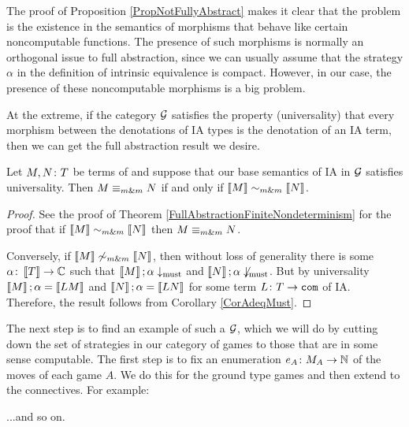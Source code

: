 \documentclass{article}
\begin{document}
The proof of Proposition \ref{PropNotFullyAbstract} makes it clear that the problem is the existence in the semantics of morphisms that behave like certain noncomputable functions.  
The presence of such morphisms is normally an orthogonal issue to full abstraction, since we can usually assume that the strategy $\alpha$ in the definition of intrinsic equivalence is compact.
However, in our case, the presence of these noncomputable morphisms is a big problem.

At the extreme, if the category $\mathcal G$ satisfies the property (universality) that every morphism between the denotations of IA types is the denotation of an IA term, then we can get the full abstraction result we desire.

\begin{theorem}
  Let $M,N\colon T$ be terms of \IAX and suppose that our base semantics of IA in $\mathcal G$ satisfies universality.  
  Then $M\mathrel{\equiv_{m\&m}} N$ if and only if $\left\llbracket M\right\rrbracket \mathrel{\sim_{m\&m}} \left\llbracket N\right\rrbracket$.
\end{theorem}
\begin{proof}
  See the proof of Theorem \ref{FullAbstractionFiniteNondeterminism} for the proof that if $\left\llbracket M\right\rrbracket \mathrel{\sim_{m\&m}} \left\llbracket N\right\rrbracket$ then $M\mathrel{\equiv_{m\&m}} N$.  

  Conversely, if $\left\llbracket M\right\rrbracket \not\mathrel{\sim_{m\&m}} \left\llbracket N\right\rrbracket$, then without loss of generality there is some $\alpha\colon\left\llbracket T\right\rrbracket \to \mathbb{C}$ such that $\left\llbracket M\right\rrbracket;\alpha \downarrow_{\operatorname{must}}$ and $\left\llbracket N\right\rrbracket;\alpha\not\downarrow_{\operatorname{must}}$.  
  But by universality $\left\llbracket M\right\rrbracket;\alpha = \left\llbracket LM\right\rrbracket$ and $\left\llbracket N\right\rrbracket;\alpha=\left\llbracket LN\right\rrbracket$ for some term $L\colon T \to {\mathtt{com}}$ of IA.  
  Therefore, the result follows from Corollary \ref{CorAdeqMust}.
\end{proof}

The next step is to find an example of such a $\mathcal G$, which we will do by cutting down the set of strategies in our category of games to those that are in some sense computable.  
The first step is to fix an enumeration $e_A\colon M_A \to \mathbb{N}$ of the moves of each game $A$.  
We do this for the ground type games and then extend to the connectives.  
For example:
...and so on.
\end{document}
